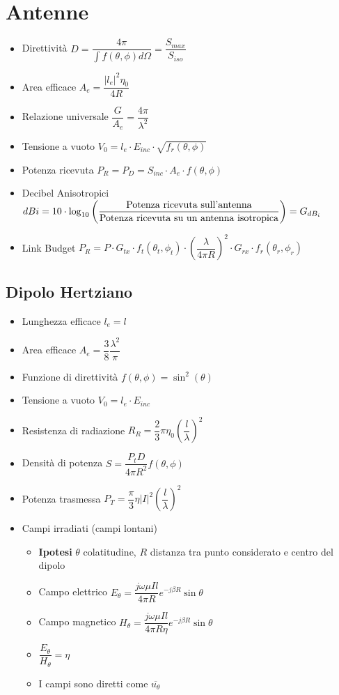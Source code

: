 \documentclass{article}
\begin{document}
\section{Antenne}
\begin{itemize}
	\item Direttività \( \displaystyle D = \dfrac{4 \pi}{\int{f(\theta, \phi) d \Omega}} = \dfrac{S_{max}}{S_{iso}} \)	
	\item Area efficace \( \displaystyle A_e = \dfrac{|l_e| ^ 2 \eta_0}{4 R} \)
	\item Relazione universale \( \dfrac{G}{A_e} = \dfrac{4 \pi}{\lambda^2} \)
	\item Tensione a vuoto \( V_0 = l_e \cdot E_{inc} \cdot \sqrt{f_r(\theta, \phi)} \)
	\item Potenza ricevuta \(P_R = P_D = S_{inc} \cdot A_e \cdot  f(\theta, \phi) \)
	\item Decibel Anisotropici \(dBi = 10 \cdot \log_{10} \left( \dfrac{\textnormal{Potenza ricevuta sull'antenna}}{\textnormal{Potenza ricevuta su un antenna isotropica}} \right) = G_{dB_i}\)
	\item Link Budget \(P_R = P \cdot G_{tx} \cdot f_t (\theta_t, \phi_t) \cdot \left( \dfrac{\lambda}{4 \pi R} \right) ^ 2 \cdot G_{rx} \cdot f_r (\theta_r, \phi_r) \)
\end{itemize}

\subsection{Dipolo Hertziano}
\begin{itemize}
	\item Lunghezza efficace \(l_e = l\)
	\item Area efficace \(A_e = \dfrac{3}{8} \dfrac{\lambda^2}{\pi} \)
	\item Funzione di direttività \(f(\theta, \phi) = \sin^2(\theta) \)
	\item Tensione a vuoto \( V_0 = l_e \cdot E_{inc} \) 
	\item Resistenza di radiazione \( R_R = \dfrac{2}{3} \pi \eta_0 \left( \dfrac{l}{\lambda} \right) ^ 2 \)
	\item Densità di potenza \( S = \dfrac{P_t D}{4 \pi R^2} f(\theta, \phi) \)
	\item Potenza trasmessa \( P_T = \dfrac{\pi}{3} \eta \left| I \right| ^2 \left(\dfrac{l}{\lambda} \right) ^ 2 \)
	\item Campi irradiati (campi lontani)
	\begin{itemize}
		\item \textbf{Ipotesi} \(\theta\) colatitudine, \(R\) distanza tra punto considerato e centro del dipolo
		\item Campo elettrico \(E_\theta = \dfrac{j \omega \mu I l}{4 \pi R} e^{-j \beta R} \sin\theta\) 
		\item Campo magnetico \(H_\theta = \dfrac{j \omega \mu I l}{4 \pi R \eta} e^{-j \beta R} \sin\theta\) 
		\item \( \dfrac{E_\theta}{H_\theta} = \eta \)
		\item I campi sono diretti come \( \overline{u_\theta} \)
	\end{itemize}
\end{itemize}
\newpage 
\end{document}
